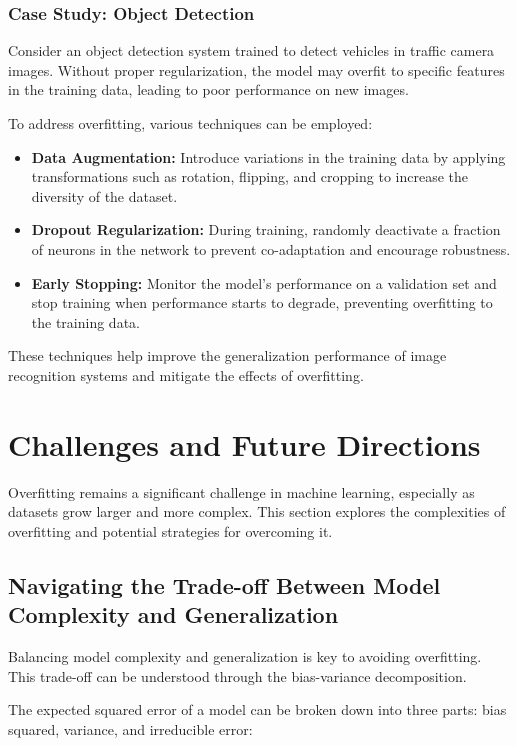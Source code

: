\documentclass[12pt]{book} %
\begin{document}
\subsubsection{Case Study: Object Detection}

Consider an object detection system trained to detect vehicles in traffic camera images. Without proper regularization, the model may overfit to specific features in the training data, leading to poor performance on new images.

To address overfitting, various techniques can be employed:

\begin{itemize}
\item \textbf{Data Augmentation:} Introduce variations in the training data by applying transformations such as rotation, flipping, and cropping to increase the diversity of the dataset.
\item \textbf{Dropout Regularization:} During training, randomly deactivate a fraction of neurons in the network to prevent co-adaptation and encourage robustness.
\item \textbf{Early Stopping:} Monitor the model's performance on a validation set and stop training when performance starts to degrade, preventing overfitting to the training data.
\end{itemize}

These techniques help improve the generalization performance of image recognition systems and mitigate the effects of overfitting.


\section{Challenges and Future Directions}

Overfitting remains a significant challenge in machine learning, especially as datasets grow larger and more complex. This section explores the complexities of overfitting and potential strategies for overcoming it.

\subsection{Navigating the Trade-off Between Model Complexity and Generalization}

Balancing model complexity and generalization is key to avoiding overfitting. This trade-off can be understood through the bias-variance decomposition.

The expected squared error of a model can be broken down into three parts: bias squared, variance, and irreducible error:
\end{document}
